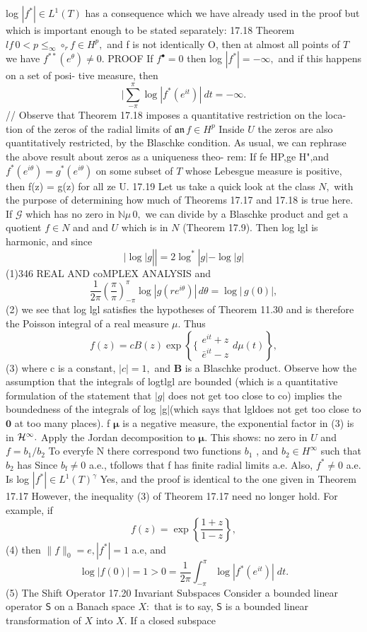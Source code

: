 log $|f^{*}|\in L^{1}(T)$ has a consequence which we have already used in the proof but which is important enough to be stated separately: 17.18 Theorem $l f\,0<p\leq_{\infty}\circ_{r}f\in H^{p},$ and f is not identically O, then at almost all points of ${\mathbf{}}T$ we have $f^{**}(e^{\theta})\neq0.$ PROOF If $f^{\bullet}=0$ then log $|f^{*}|=-\infty,$ and if this happens on a set of posi- tive measure, then $$ \vert\sum_{-\pi}^{\pi}\log|f^{*}(e^{i t})|~d t=-\infty. $$ // Observe that Theorem 17.18 imposes a quantitative restriction on the loca- tion of the zeros of the radial limits of ${\mathfrak{a n}}\,f\in H^{p}$ Inside $U$ the zeros are also quantitatively restricted, by the Blaschke condition. As usual, we can rephrase the above result about zeros as a uniqueness theo- rem: If fe HP,ge H",and $f^{*}(e^{i\theta})=g^{*}(e^{i\theta})$ on some subset of ${\mathbf{}}T$ whose Lebesgue measure is positive, then f(z) = g(z) for all ze U. 17.19 Let us take a quick look at the class $N,$ with the purpose of determining how much of Theorems 17.17 and 17.18 is true here. If $\scriptstyle{\mathcal{G}}$ which has no zero in $\scriptstyle{\mathbb{N}}\mu\,0,$ we can divide by a Blaschke product and get a quotient $f\in N$ and and $U$ which is in ${\mathbf{}}N$ (Theorem 17.9). Then log lgl is harmonic, and since $$ |\log|g|\left.\right|=2\log^{*}|g|-\log|g| $$ (1)346 REAL AND coMPLEX ANALYSIS and $$ \frac{1}{2\pi}\left(\frac{\pi}{\pi}\right)_{-\pi}^{\pi}\log\left|g(r e^{i\theta})\right|\,d\theta=\log\left|\,g(0)\right|, $$ (2) we see that log lgl satisfies the hypotheses of Theorem 11.30 and is therefore the Poisson integral of a real measure $\mu.$ Thus $$ f(z)=c B(z)\exp\left\{ \{\begin{array}{c}{{e^{i t}+z}}\\ {{\bar{e}^{i t}-z}}\end{array}d\mu(t)\right\}, $$ (3) where c is a constant, $|c|=1,$ and $\boldsymbol{B}$ is a Blaschke product. Observe how the assumption that the integrals of logtlgl are bounded (which is a quantitative formulation of the statement that $|g|$ does not get too close to co) implies the boundedness of the integrals of log |g|(which says that lgldoes not get too close to $\mathbf{0}$ at too many places). f ${\boldsymbol{\mu}}$ is a negative measure, the exponential factor in (3) is in ${\cal H}^{\infty}.$ Apply the Jordan decomposition to ${\boldsymbol{\mu}}.$ This shows: no zero in $U$ and $f=b_{1}/b_{2}$ To everyfe N there correspond two functions $b_{1}$ , and $b_{2}\in H^{\infty}$ such that $b_{2}$ has Since $\scriptstyle b_{\mathrm{f}}\neq0$ a.e., tfollows that f has finite radial limits a.e. Also, $f^{*}\neq0$ a.e. Is log $|f^{*}|\in L^{1}(T)^{\gamma}$ Yes, and the proof is identical to the one given in Theorem 17.17 However, the inequality (3) of Theorem 17.17 need no longer hold. For example, if $$ f(z)=\exp{\left\{{\frac{1+z}{1-z}}\right\}}, $$ (4) then $\|f\|_{0}=e,|f^{*}|=1$ a.e, and $$ \log|f(0)|=1>0=\frac{1}{2\pi}\int_{-\pi}^{\pi}\log|f^{*}(e^{i t})|\;d t. $$ (5) The Shift Operator 17.20 Invariant Subspaces Consider a bounded linear operator $\boldsymbol{\mathsf{S}}$ on a Banach space $X{\mathrm{:}}$ that is to say, $\boldsymbol{\mathsf{S}}$ is a bounded linear transformation of $X$ into $X.$ If a closed subspace 